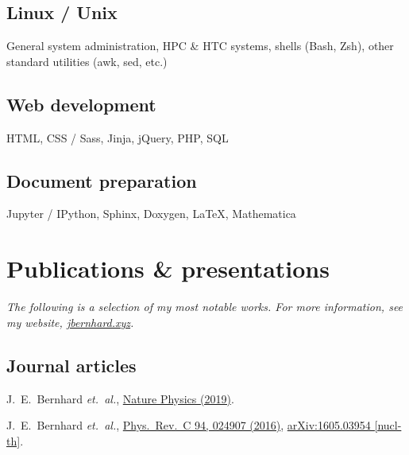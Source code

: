 \documentclass[letterpaper,10pt]{article}
\begin{document}
\begin{multicols}{2}
\subsection{Linux / Unix}

General system administration, HPC \& HTC systems, shells (Bash, Zsh), other standard utilities (awk, sed, etc.)

\subsection{Web development}

HTML, CSS / Sass, Jinja, jQuery, PHP, SQL

\subsection{Document preparation}

Jupyter / IPython, Sphinx, Doxygen, \LaTeX, Mathematica



\section{Publications \& presentations}

\vspace{-.5\parskip}
\emph{%
  \small
  The following is a selection of my most notable works.
  For more information, see my website, \href{https://jbernhard.xyz}{jbernhard.xyz}.
}
\vspace{-.5\parskip}



\subsection{Journal articles}

J.~E.~Bernhard \textit{et.\ al.},
\href{https://www.nature.com/articles/s41567-019-0611-8}{Nature Physics (2019)}.

J.~E.~Bernhard \textit{et.\ al.},
\href{https://journals.aps.org/prc/abstract/10.1103/PhysRevC.94.024907}{Phys.\ Rev.\ C 94, 024907 (2016)},
\href{https://arxiv.org/abs/1605.03954}{arXiv:1605.03954 [nucl-th]}.


\end{multicols}
\end{document}
